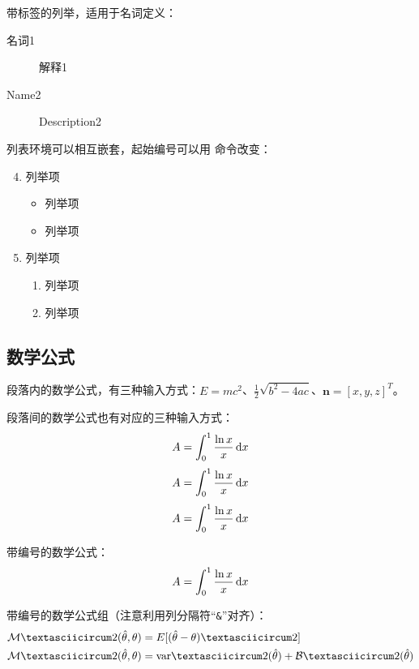 带标签的列举，适用于名词定义：
\begin{description}
	\item[名词1] 解释1
	\item[Name2] Description2
\end{description}

列表环境可以相互嵌套，起始编号可以用  命令改变：
\begin{enumerate}
    \setcounter{enumi}{3}
	\item 列举项
    \begin{itemize}
    	\item 列举项
    	\item 列举项
    \end{itemize}
	\item 列举项
	\begin{enumerate}
    	\item 列举项
    	\item 列举项
	\end{enumerate}
\end{enumerate}


\subsection{数学公式}
段落内的数学公式，有三种输入方式：$E=mc^2$、\(\frac{1}{2}\sqrt{b^2-4ac}\)、\begin{math}\mathbf{n}=[x, y, z]^T\end{math}。

段落间的数学公式也有对应的三种输入方式：
$$A=\int_0^1 \frac{\ln{x}}{x}\mathop{}\!\mathrm{d} x$$
\[
A=\int_0^1 \frac{\ln{x}}{x}\mathop{}\!\mathrm{d} x
\]
\begin{displaymath}
A=\int_0^1 \frac{\ln{x}}{x}\mathop{}\!\mathrm{d} x
\end{displaymath}

带编号的数学公式：
\begin{equation}\label{eq:samples:one}
A=\int_0^1 \frac{\ln{x}}{x}\mathop{}\!\mathrm{d} x
\end{equation}

带编号的数学公式组（注意利用列分隔符“\texttt{\&}”对齐）：
\begin{align}
{\cal M}ˆ2(\hat{\theta},\theta) &= E[(\hat{\theta} - \theta)ˆ2] \\
{\cal M}ˆ2(\hat{\theta},\theta) &= \textrm{var}ˆ2(\hat{\theta}) + {\cal B}ˆ2(\hat{\theta})
\end{align}

